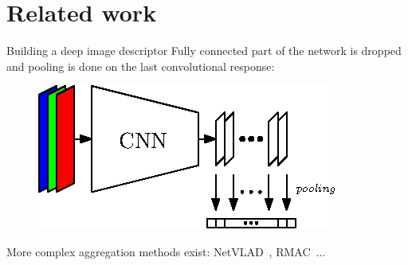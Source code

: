 \section{Related work}

\label{sec:related_work}

\begin{frame}{Building a deep image descriptor}
	Fully connected part of the network is dropped and pooling is done on the last convolutional response:
	\vfill
	\begin{figure}
		\centering
		\includegraphics[width=0.8\linewidth]{vect/MAC.eps}			
	\end{figure}
	\vfill
	More complex aggregation methods exist: NetVLAD~\cite{Arandjelovic2017}, RMAC~\cite{Radenovic2016}...
\end{frame}

